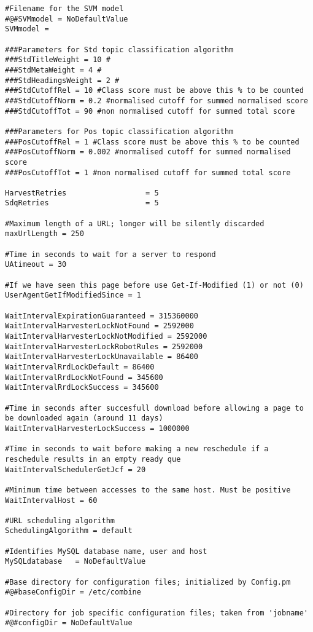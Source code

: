 \begin{verbatim}
#Filename for the SVM model
#@#SVMmodel = NoDefaultValue
SVMmodel =

###Parameters for Std topic classification algorithm
###StdTitleWeight = 10 #
###StdMetaWeight = 4 #
###StdHeadingsWeight = 2 #
###StdCutoffRel = 10 #Class score must be above this % to be counted
###StdCutoffNorm = 0.2 #normalised cutoff for summed normalised score
###StdCutoffTot = 90 #non normalised cutoff for summed total score

###Parameters for Pos topic classification algorithm
###PosCutoffRel = 1 #Class score must be above this % to be counted
###PosCutoffNorm = 0.002 #normalised cutoff for summed normalised score
###PosCutoffTot = 1 #non normalised cutoff for summed total score

HarvestRetries                  = 5
SdqRetries                      = 5

#Maximum length of a URL; longer will be silently discarded
maxUrlLength = 250

#Time in seconds to wait for a server to respond
UAtimeout = 30

#If we have seen this page before use Get-If-Modified (1) or not (0) 
UserAgentGetIfModifiedSince = 1

WaitIntervalExpirationGuaranteed = 315360000
WaitIntervalHarvesterLockNotFound = 2592000
WaitIntervalHarvesterLockNotModified = 2592000
WaitIntervalHarvesterLockRobotRules = 2592000
WaitIntervalHarvesterLockUnavailable = 86400
WaitIntervalRrdLockDefault = 86400
WaitIntervalRrdLockNotFound = 345600
WaitIntervalRrdLockSuccess = 345600

#Time in seconds after succesfull download before allowing a page to be downloaded again (around 11 days)
WaitIntervalHarvesterLockSuccess = 1000000

#Time in seconds to wait before making a new reschedule if a reschedule results in an empty ready que
WaitIntervalSchedulerGetJcf = 20

#Minimum time between accesses to the same host. Must be positive
WaitIntervalHost = 60

#URL scheduling algorithm
SchedulingAlgorithm = default

#Identifies MySQL database name, user and host
MySQLdatabase   = NoDefaultValue

#Base directory for configuration files; initialized by Config.pm
#@#baseConfigDir = /etc/combine

#Directory for job specific configuration files; taken from 'jobname'
#@#configDir = NoDefaultValue


\end{verbatim}
